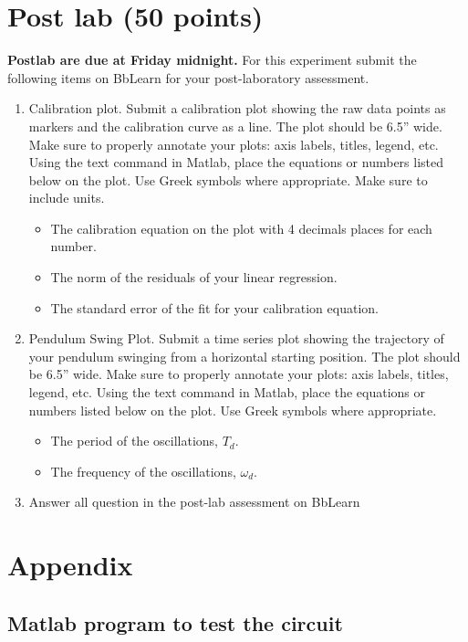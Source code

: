 \documentclass{article} %
\begin{document}
\clearpage

\clearpage
\section{Post lab (50 points)}
\textbf {Postlab are due at Friday midnight.} For this experiment submit the following items on BbLearn for your post-laboratory assessment.
\begin{enumerate}
\item Calibration plot.  Submit a calibration plot showing the raw data points as markers and the calibration curve as a line. The plot should be 6.5” wide. Make sure to properly annotate your plots: axis labels, titles, legend, etc. Using the text command in Matlab, place the equations or numbers listed below on the plot. Use Greek symbols where appropriate.  Make sure to include units.
\begin{itemize}
\item	The calibration equation on the plot with 4 decimals places for each number.  
\item	The norm of the residuals of your linear regression.
\item	The standard error of the fit for your calibration equation. 
\end{itemize}
\item Pendulum Swing Plot.  Submit a time series plot showing the trajectory of your pendulum swinging from a horizontal starting position. The plot should be 6.5” wide. Make sure to properly annotate your plots: axis labels, titles, legend, etc. Using the text command in Matlab, place the equations or numbers listed below on the plot. Use Greek symbols where appropriate.
\begin{itemize}
\item	The period of the oscillations, $T_d$. 
\item The frequency of the oscillations, $\omega_d$.
\end{itemize}
\item Answer all question in the post-lab assessment on BbLearn
\end{enumerate}

\clearpage
\section{Appendix}
\subsection{Matlab program to test the circuit}
\label{app:testingCode}

\end{document}
